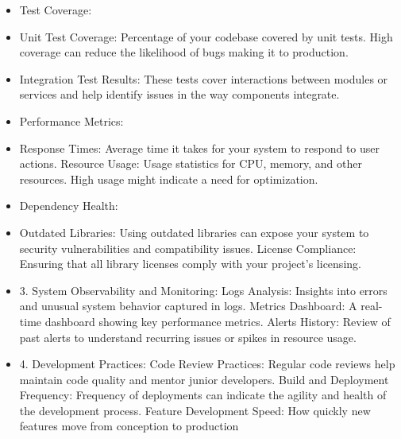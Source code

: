 \documentclass[12pt, a4paper, oneside]{book}
\begin{document}
\begin{spacing}{1.5}
\begin{itemize}
\item Test Coverage:
\item Unit Test Coverage: Percentage of your codebase covered by unit tests. High coverage can reduce the likelihood of bugs making it to production.
\item Integration Test Results: These tests cover interactions between modules or services and help identify issues in the way components integrate.
\item Performance Metrics:
\item Response Times: Average time it takes for your system to respond to user actions.
Resource Usage: Usage statistics for CPU, memory, and other resources. High usage might indicate a need for optimization.
\item Dependency Health:
\item Outdated Libraries: Using outdated libraries can expose your system to security vulnerabilities and compatibility issues.
License Compliance: Ensuring that all library licenses comply with your project's licensing.
\item 3. System Observability and Monitoring:
Logs Analysis: Insights into errors and unusual system behavior captured in logs.
Metrics Dashboard: A real-time dashboard showing key performance metrics.
Alerts History: Review of past alerts to understand recurring issues or spikes in resource usage.
\item 4. Development Practices:
Code Review Practices: Regular code reviews help maintain code quality and mentor junior developers.
Build and Deployment Frequency: Frequency of deployments can indicate the agility and health of the development process.
Feature Development Speed: How quickly new features move from conception to production
\end{itemize}



\end{spacing}
\end{document}
